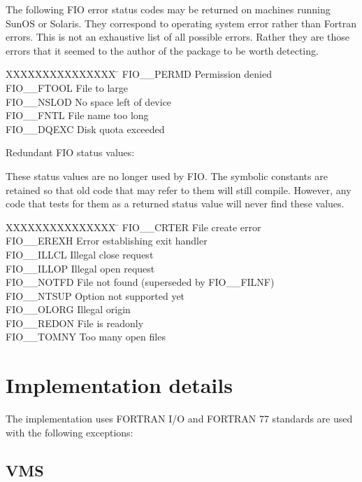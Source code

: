 The following FIO error status codes may be returned on machines running SunOS
or Solaris. They correspond to operating system error rather than Fortran
errors. This is not an exhaustive list of all possible errors. Rather they are
those errors that it seemed to the author of the package to be worth detecting.

\begin{tabbing}
XXXXXXXXXXXXXXX \= \kill
FIO\_\_PERMD \> Permission denied \\
FIO\_\_FTOOL \> File to large \\
FIO\_\_NSLOD \> No space left of device \\
FIO\_\_FNTL  \> File name too long \\
FIO\_\_DQEXC \> Disk quota exceeded \\
\end{tabbing}

Redundant FIO status values:

These status values are no longer used by FIO. The symbolic constants are
retained so that old code that may refer to them will still compile. However,
any code that tests for them as a returned status value will never find these
values.

\begin{tabbing}
XXXXXXXXXXXXXXX \= \kill
FIO\_\_CRTER \> File create error \\
FIO\_\_EREXH \> Error establishing exit handler \\
FIO\_\_ILLCL \> Illegal close request \\
FIO\_\_ILLOP \> Illegal open request \\
FIO\_\_NOTFD \> File not found (superseded by FIO\_\_FILNF) \\
FIO\_\_NTSUP \> Option not supported yet \\
FIO\_\_OLORG \> Illegal origin \\
FIO\_\_REDON \> File is readonly \\
FIO\_\_TOMNY \> Too many open files \\
\end{tabbing}

\section{Implementation details}

The implementation uses FORTRAN I/O and FORTRAN 77 standards are used with 
the following exceptions:

\subsection{VMS}

